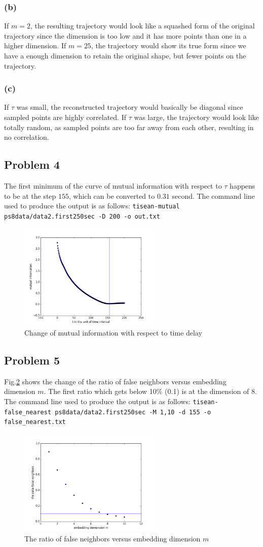 \documentclass{article}
\begin{document}
\subsubsection*{(b)}
If $m = 2$, the resulting trajectory would look like a squashed form of the original trajectory since the dimension is too low and it has more points than one in a higher dimension. If $m = 25$, the trajectory would show its true form since we have a enough dimension to retain the original shape, but fewer points on the trajectory. 

\subsubsection*{(c)}
If $\tau$ was small, the reconstructed trajectory would basically be diagonal since sampled points are highly correlated. If $\tau$ was large, the trajectory would look like totally random, as sampled points are too far away from each other, resulting in no correlation.
\subsection*{Problem 4}
The first minimum of the curve of mutual information with respect to $\tau$ happens to be at the step $155$, which can be converted to $0.31$ second. The command line used to produce the output is as follows: \texttt{tisean-mutual ps8data/data2.first250sec -D 200 -o out.txt}

\begin{figure}[h]
  \centering
  \includegraphics[height=2in]{figs/q4.png}
  \caption{Change of mutual information with respect to time delay}
  \label{q4}
  \end{figure}
  
\subsection*{Problem 5}
Fig.\ref{q5} shows the change of the ratio of false neighbors versus embedding dimension $m$. The first ratio which gets below 10\% (0.1) is at the dimension of $8$.  The command line used to produce the output is as follows: \texttt{tisean-false\_nearest ps8data/data2.first250sec -M 1,10 -d 155 -o false\_nearest.txt}


\begin{figure}[h]
  \centering
  \includegraphics[height=2in]{figs/q5.png}
  \caption{The ratio of false neighbors versus embedding dimension $m$}
  \label{q5}
  \end{figure}
\end{document}

